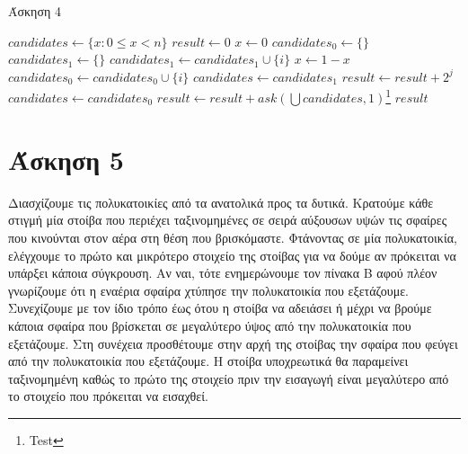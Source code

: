 \documentclass[11pt,a4paper]{book}
\begin{document}
\begin{algorithm}[H]
\caption{\textgreek{Άσκηση 4}}
\begin{algorithmic}[1]
    \State $candidates \gets \{ x: 0 \leq x < n \}$
    \State $result \gets 0$
        \State $x \gets 0$
        \State $candidates_0 \gets \{\}$
        \State $candidates_1 \gets \{\}$
                \State $candidates_1 \gets candidates_1 \cup \{ i \}$
                \State $x \gets 1 - x$
            \Else
                \State $candidates_0 \gets candidates_0 \cup \{ i \}$
            \EndIf
        \EndFor
            \State $candidates \gets candidates_1$
            \State $result \gets result + 2 ^ j$
        \Else
            \State $candidates \gets candidates_0$
        \EndIf
    \EndFor
    \State $result \gets result + ask( \bigcup candidates, 1 )$\footnote{Test}
    \State \Return $result$
\EndProcedure
\end{algorithmic}
\end{algorithm}

\section*{Άσκηση 5}
Διασχίζουμε τις πολυκατοικίες από τα ανατολικά προς τα δυτικά. Κρατούμε κάθε στιγμή μία στοίβα που περιέχει ταξινομημένες σε σειρά αύξουσων υψών τις σφαίρες που κινούνται στον αέρα στη θέση που βρισκόμαστε. Φτάνοντας σε μία πολυκατοικία, ελέγχουμε το πρώτο και μικρότερο στοιχείο της στοίβας για να δούμε αν πρόκειται να υπάρξει κάποια σύγκρουση. Αν ναι, τότε ενημερώνουμε τον πίνακα Β αφού πλέον γνωρίζουμε ότι η εναέρια σφαίρα χτύπησε την πολυκατοικία που εξετάζουμε. Συνεχίζουμε με τον ίδιο τρόπο έως ότου η στοίβα να αδειάσει ή μέχρι να βρούμε κάποια σφαίρα που βρίσκεται σε μεγαλύτερο ύψος από την πολυκατοικία που εξετάζουμε. Στη συνέχεια προσθέτουμε στην αρχή της στοίβας την σφαίρα που φεύγει από την πολυκατοικία που εξετάζουμε. Η στοίβα υποχρεωτικά θα παραμείνει ταξινομημένη καθώς το πρώτο της στοιχείο πριν την εισαγωγή είναι μεγαλύτερο από το στοιχείο που πρόκειται να εισαχθεί.
\end{document}
